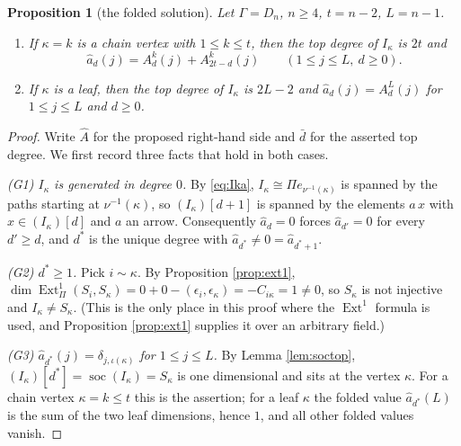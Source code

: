\documentclass[reqno]{amsart}
\theoremstyle{plain}
\newtheorem{proposition}[theorem]{Proposition}
\theoremstyle{definition}
\DeclareMathOperator{\soc}{soc}
\DeclareMathOperator{\Ext}{Ext}
\newcommand{\ka}{\kappa}
\newcommand{\Pia}{\Pi}
\begin{document}
\begin{proposition}[the folded solution]\label{prop:foldsol}
Let $\Gamma=D_n$, $n\ge4$, $t=n-2$, $L=n-1$.
\begin{enumerate}
\item[\textup{(a)}] If $\ka=k$ is a chain vertex with $1\le k\le t$, then the
top degree of $I_\ka$ is $2t$ and
\[
   \hat a_d(j)=A^{k}_d(j)+A^{k}_{2t-d}(j)\qquad(1\le j\le L,\ d\ge0).
\]
\item[\textup{(b)}] If $\ka$ is a leaf, then the top degree of $I_\ka$ is
$2L-2$ and $\hat a_d(j)=A^{L}_d(j)$ for $1\le j\le L$ and $d\ge0$.
\end{enumerate}
\end{proposition}

\begin{proof}
Write $\hat A$ for the proposed right-hand side and $\bar d$ for the asserted
top degree.  We first record three facts that hold in both cases.

\emph{(G1) $I_\ka$ is generated in degree $0$.}  By \eqref{eq:Ika},
$I_\ka\cong\Pia e_{\nu^{-1}(\ka)}$ is spanned by the paths starting at
$\nu^{-1}(\ka)$, so $(I_\ka)[d+1]$ is spanned by the elements $a\,x$ with
$x\in(I_\ka)[d]$ and $a$ an arrow.  Consequently $\hat a_d=0$ forces
$\hat a_{d'}=0$ for every $d'\ge d$, and $d^{*}$ is the unique degree with
$\hat a_{d^{*}}\ne0=\hat a_{d^{*}+1}$.

\emph{(G2) $d^{*}\ge1$.}  Pick $i\sim\ka$.  By Proposition \ref{prop:ext1},
$\dim\Ext^1_\Pia(S_i,S_\ka)=0+0-(\epsilon_i,\epsilon_\ka)=-C_{i\ka}=1\ne0$,
so $S_\ka$ is not injective and $I_\ka\ne S_\ka$.  (This is the only place in
this proof where the $\Ext^1$ formula is used, and Proposition
\ref{prop:ext1} supplies it over an arbitrary field.)

\emph{(G3) $\hat a_{d^{*}}(j)=\delta_{j,\iota(\ka)}$ for $1\le j\le L$.}  By
Lemma \ref{lem:soctop}, $(I_\ka)[d^{*}]=\soc(I_\ka)=S_\ka$ is one dimensional
and sits at the vertex $\ka$.  For a chain vertex $\ka=k\le t$ this is the
assertion; for a leaf $\ka$ the folded value $\hat a_{d^{*}}(L)$ is the sum of
the two leaf dimensions, hence $1$, and all other folded values vanish.


\end{proof}
\end{document}

